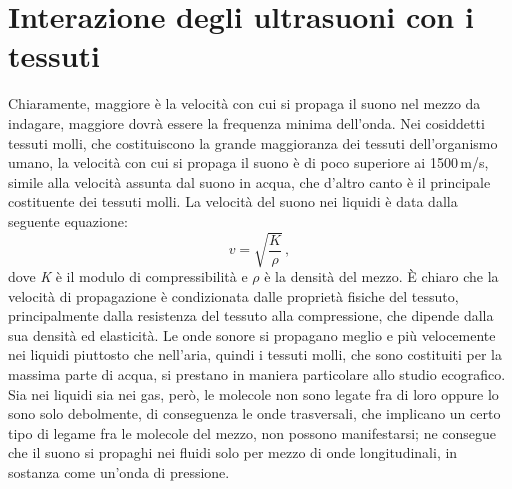 \documentclass{report}
\numberwithin{equation}{section}
\numberwithin{figure}{section}
\begin{document}
\section{Interazione degli ultrasuoni con i tessuti}
Chiaramente, maggiore è la velocità con cui si propaga il suono nel mezzo da indagare, maggiore dovrà essere la frequenza minima dell'onda. Nei cosiddetti tessuti molli, che costituiscono la grande maggioranza dei tessuti dell'organismo umano, la velocità con cui si propaga il suono è di poco superiore ai 1500\,m/s, simile alla velocità assunta dal suono in acqua, che d'altro canto è il principale costituente dei tessuti molli. La velocità del suono nei liquidi è data dalla seguente equazione:
\begin{equation}
    v = \sqrt{\frac{K}{\rho}}\,,
\end{equation}
dove \textit{K} è il modulo di compressibilità e $\rho$ è la densità del mezzo. È chiaro che la velocità di propagazione è condizionata dalle proprietà fisiche del tessuto, principalmente dalla resistenza del tessuto alla compressione, che dipende dalla sua densità ed elasticità. Le onde sonore si propagano meglio e più velocemente nei liquidi piuttosto che nell'aria, quindi i tessuti molli, che sono costituiti per la massima parte di acqua, si prestano in maniera particolare allo studio ecografico. Sia nei liquidi sia nei gas, però, le molecole non sono legate fra di loro oppure lo sono solo debolmente, di conseguenza le onde trasversali, che implicano un certo tipo di legame fra le molecole del mezzo, non possono manifestarsi; ne consegue che il suono si propaghi nei fluidi solo per mezzo di onde longitudinali, in sostanza come un'onda di pressione.
\end{document}
